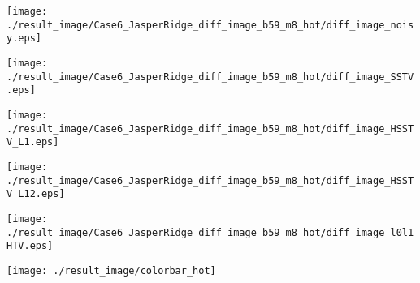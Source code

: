 \begin{figure*}[t]
\begin{center}
        \begin{minipage}{0.150\hsize}
            \centerline{\hspace{\hsize}} %
		\end{minipage}
        \begin{minipage}{0.150\hsize}
            \centerline{\texttt{[image: ./result\_image/Case6\_JasperRidge\_diff\_image\_b59\_m8\_hot/diff\_image\_noisy.eps]}} %
        \end{minipage}
        \begin{minipage}{0.150\hsize}
            \centerline{\texttt{[image: ./result\_image/Case6\_JasperRidge\_diff\_image\_b59\_m8\_hot/diff\_image\_SSTV.eps]}} %
        \end{minipage}
        \begin{minipage}{0.150\hsize}
            \centerline{\texttt{[image: ./result\_image/Case6\_JasperRidge\_diff\_image\_b59\_m8\_hot/diff\_image\_HSSTV\_L1.eps]}} %
        \end{minipage}
        \begin{minipage}{0.150\hsize}
            \centerline{\texttt{[image: ./result\_image/Case6\_JasperRidge\_diff\_image\_b59\_m8\_hot/diff\_image\_HSSTV\_L12.eps]}} %
        \end{minipage}
        \begin{minipage}{0.150\hsize}
            \centerline{\texttt{[image: ./result\_image/Case6\_JasperRidge\_diff\_image\_b59\_m8\_hot/diff\_image\_l0l1HTV.eps]}} %
        \end{minipage}
        \begin{minipage}{0.055\hsize}
            \centerline{\texttt{[image: ./result\_image/colorbar\_hot]}} %
        \end{minipage}

        \vspace{1mm}


\end{center}
\end{figure*}
